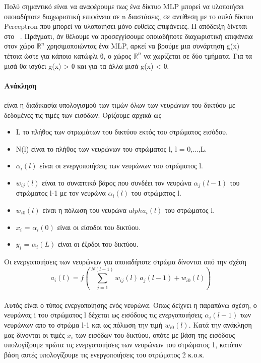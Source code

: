 \documentclass[12pt]{article}
\numberwithin{equation}{section}
\begin{document}
Πολύ σημαντικό είναι να αναφέρουμε πως ένα δίκτυο MLP μπορεί να υλοποιήσει οποιαδήποτε διαχωριστική επιφάνεια σε n διαστάσεις, σε αντίθεση με το απλό δίκτυο Perceptron που μπορεί να υλοποιήσει μόνο ευθείες επιφάνειες. Η απόδειξη δίνεται στο ~\cite{HORNIK1989359}. Πράγματι, άν θέλουμε να προσεγγίσουμε οποιαδήποτε διαχωριστική επιφάνεια στον χώρο \(\mathbb{R}^n\) χρησιμοποιώντας ένα MLP, αρκεί να βρούμε μια συνάρτηση g(x) τέτοια ώστε για κάποιο κατώφλι θ, ο χώρος \(\mathbb{R}^n\) να χωρίζεται σε δύο τμήματα. Για τα μισά θα ισχύει g(x) > θ και για τα άλλα μισά g(x) < θ. \\

\paragraph{Ανάκληση} είναι η διαδικασία υπολογισμού των τιμών όλων των νευρώνων του δικτύου με δεδομένες τις τιμές των εισόδων. Ορίζουμε αρχικά ως

\begin{itemize}
  \item L το πλήθος των στρωμάτων του δικτύου εκτός του στρώματος εισόδου.
  \item N(l) είναι το πλήθος των νευρώνων του στρώματος l, l = 0,...,L.
  \item \(\alpha_i(l)\) είναι οι ενεργοποιήσεις των νευρώνων του στρώματος l.
  \item \(w_{ij}(l)\) είναι το συναπτικό βάρος που συνδέει τον νευρώνα \(\alpha_j(l-1)\) του στρώματος l-1 με τον νευρώνα \(\alpha_i(l)\) του στρώματος l.
   \item \(w_{i0}(l)\) είναι η πόλωση του νευρώνα \(alpha_i(l)\) του στρώματος l.
   \item \(x_i\) = \(\alpha_i(0)\) είναι οι είσοδοι του δικτύου.
   \item \(y_i\) = \(\alpha_i(L)\) είναι οι έξοδοι του δικτύου.
\end{itemize}  

Οι ενεργοποιήσεις των νευρώνων για οποιαδήποτε στρώμα δίνονται από την σχέση\\

\begin{equation}
a_i(l) = f\left( \sum_{j=1}^{N(l-1)} w_{ij}(l) \, a_j(l-1) + w_{i0}(l) \right)
\end{equation} \\

Αυτός είναι ο τύπος ενεργοποίησης ενός νευρώνα. Όπως δείχνει η παραπάνω σχέση, ο νευρώνας i του στρώματος l δέχεται ως εισόδους τις ενεργοποιήσεις \(\alpha_i(l-1)\) των νευρώνων απο το στρώμα l-1 και ως πόλωση την τιμή \(w_{i0}(l)\). Κατά την ανάκληση μας δίνονται οι τιμές \(x_i\) των εισόδων του δικτύου, οπότε με βάση της εισόδους υπολογίζουμε πρώτα τις ενεργοποιήσεις των νευρώνων του στρώματος 1, κατόπιν βάση αυτές υπολογίζουμε τις ενεργοποιήσεις του στρώματος 2 κ.ο.κ. 
\end{document}
